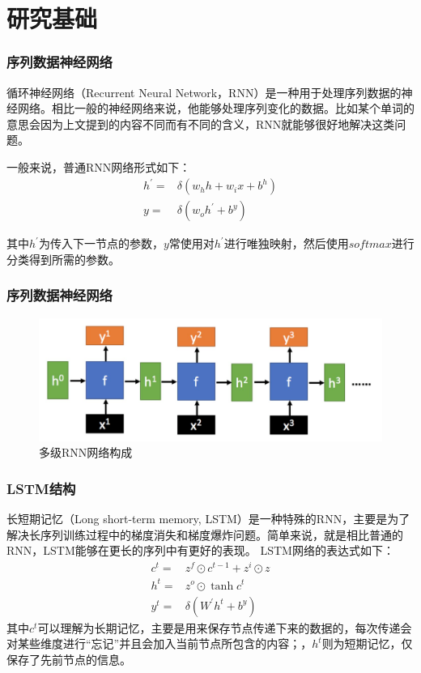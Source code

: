 \documentclass[aspectratio=169, 10pt, utf8, mathserif]{beamer}
\begin{document}
\section{研究基础}
\begin{frame}
	\frametitle{序列数据神经网络}
	循环神经网络（Recurrent Neural Network，RNN）是一种用于处理序列数据的神经网络。相比一般的神经网络来说，他能够处理序列变化的数据。比如某个单词的意思会因为上文提到的内容不同而有不同的含义，RNN就能够很好地解决这类问题。
	
	一般来说，普通RNN网络形式如下：
	\begin{align}
		h^{\prime}=&\delta(w_h h+w_i x+b^{h})\\
		y=&\delta( w_o h^{\prime}+b^{y})
	\end{align}
	
	
	其中$ h^{\prime} $为传入下一节点的参数，$ y $常使用对$ h^{\prime} $进行唯独映射，然后使用$ softmax $进行分类得到所需的参数。
\end{frame}	
\begin{frame}
	\frametitle{序列数据神经网络}
	\begin{figure}[H]
		\centering
		\includegraphics[width=\linewidth]{pic/screenshot001}
		\caption{多级RNN网络构成}
		\label{fig:screenshot001}
	\end{figure}
\end{frame}	
\begin{frame}
	\frametitle{LSTM结构}
	长短期记忆（Long short-term memory, LSTM）是一种特殊的RNN，主要是为了解决长序列训练过程中的梯度消失和梯度爆炸问题。简单来说，就是相比普通的RNN，LSTM能够在更长的序列中有更好的表现。
	LSTM网络的表达式如下：
	\begin{align}
		c^t=&z^f\odot c^{t-1}+z^{i}\odot z\\
		h^{t}=&z^{o}\odot \tanh{c^{t}}\\
		y^{t}=&\delta(W^{\prime}h^{t}+b^{y})
	\end{align}
其中$ c^{t} $可以理解为长期记忆，主要是用来保存节点传递下来的数据的，每次传递会对某些维度进行“忘记”并且会加入当前节点所包含的内容；，$ h^{t} $则为短期记忆，仅保存了先前节点的信息。
\end{frame}	
\end{document}
